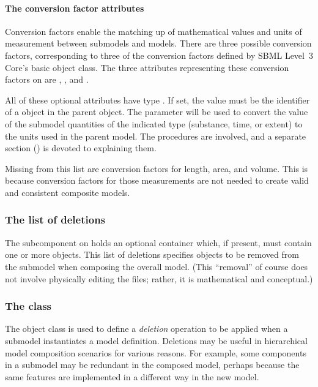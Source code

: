 \paragraph{The conversion factor attributes}
\label{submodel-conversion}

Conversion factors enable the matching up of mathematical values and
units of measurement between submodels and models.  There are three
possible conversion factors, corresponding to three of the conversion factors
defined by SBML Level~3 Core's basic \Model object class.  The three
attributes representing these conversion factors on \Submodel are
, , 
and .

All of these optional attributes have type .  If set,
the value must be the identifier of a \Parameter object in the parent
\Model object.  The parameter will be used to convert the value of the
submodel quantities of the indicated type (substance, time, or extent) to
the units used in the parent model.  The procedures are involved, and a
separate section () is devoted to explaining
them.

Missing from this list are conversion factors for length, area, and volume.
This is because conversion factors for those measurements are not needed
to create valid and consistent composite models.


\subsubsection{The list of deletions}
\label{listofdeletions}

The  subcomponent on \Submodel holds an optional
\ListOfDeletions container which, if present, must contain one or more
\Deletion objects.  This list of deletions specifies objects to be
removed from the submodel when composing the overall model.  (This
``removal'' of course does not involve physically editing the files;
rather, it is mathematical and conceptual.)


\subsubsection{The  class}
\label{deletion-class}

The \Deletion object class is used to define a \emph{deletion} operation
to be applied when a submodel instantiates a model definition.
Deletions may be useful in hierarchical model composition scenarios for
various reasons.  For example, some components in a submodel may be
redundant in the composed model, perhaps because the same features are
implemented in a different way in the new model.

